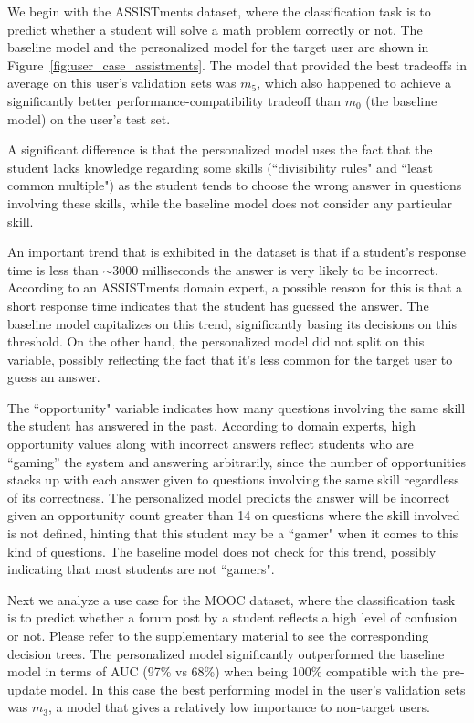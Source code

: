 \documentclass[letterpaper]{article}
\theoremstyle{definition}
\begin{document}
We begin with the ASSISTments dataset, where the classification task is to predict whether a student will solve a math problem correctly or not.  The baseline model and the personalized model for the target user are shown in Figure~\ref{fig:user_case_assistments}.
The model that provided the best tradeoffs in average on this user's validation sets was $m_5$, which also happened to achieve a significantly better performance-compatibility tradeoff than $m_0$ (the baseline model) on the user's test set.


A significant difference is that the personalized model uses the fact that the student lacks knowledge regarding some skills (``divisibility rules" and ``least common multiple") as the student tends to choose the wrong answer in questions involving these skills, while the baseline model does not consider any particular skill.

An important  trend that is  exhibited in  the dataset is that if a student's response time is less than $\sim$3000 milliseconds the answer is very likely to be incorrect.
According to an ASSISTments domain expert, a possible reason for this is that a short response time indicates that the student has guessed the answer.
The baseline model capitalizes on this trend, significantly basing its decisions on this threshold.
On the other hand, the personalized model did not split on this variable, possibly reflecting the fact that it's less common for the target user to guess an answer.

The ``opportunity" variable indicates how many questions involving the same skill the student has answered in the past.
According to domain experts, high opportunity values along with incorrect answers reflect students who are ``gaming'' the system and answering arbitrarily, since the number of opportunities stacks up with each answer given to questions involving the same skill regardless of its correctness.
The personalized model predicts the answer will be incorrect given an opportunity count greater than 14 on questions where the skill involved is not defined, hinting that this student may be a ``gamer" when it comes to this kind of questions. The baseline model does not check for this trend, possibly indicating that most students are not ``gamers".






Next we analyze a use case for the MOOC dataset, where the classification task is to predict whether a forum post by a student reflects a high level of confusion or not. Please refer to the supplementary material to see the corresponding decision trees. The personalized model significantly outperformed the baseline model in terms of AUC (97\% vs 68\%) when being 100\% compatible with the pre-update model. In this case the best performing model in the user's validation sets was $m_3$, a model that gives a relatively low importance to non-target users.
\end{document}
